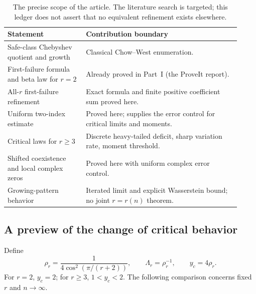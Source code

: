 \documentclass[11pt]{article}
\numberwithin{equation}{section}
\theoremstyle{definition}
\begin{document}
\begin{table}[ht]
\centering\small
\begin{tabular}{@{}p{0.31\linewidth}p{0.61\linewidth}@{}}
\toprule
Statement & Contribution boundary \\
\midrule
Safe-class Chebyshev quotient and growth & Classical Chow--West enumeration. \\
First-failure formula and beta law for \(r=2\) & Already proved in Part~I (the ProveIt report). \\
All-\(r\) first-failure refinement & Exact formula and finite positive coefficient sum proved here. \\
Uniform two-index estimate & Proved here; supplies the error control for critical limits and moments. \\
Critical laws for \(r\ge3\) & Discrete heavy-tailed deficit, sharp variation rate, moment threshold. \\
Shifted coexistence and local complex zeros & Proved here with uniform complex error control. \\
Growing-pattern behavior & Iterated limit and explicit Wasserstein bound; no joint \(r=r(n)\) theorem. \\
\bottomrule
\end{tabular}
\caption{The precise scope of the article. The literature search is targeted;
this ledger does not assert that no equivalent refinement exists elsewhere.}
\label{fpf:lp:tab:scope}
\end{table}

\subsection{A preview of the change of critical behavior}

Define
\begin{equation}\label{fpf:lp:eq:critical-location}
 \rho_r=\frac1{4\cos^2(\pi/(r+2))},\qquad
 \Lambda_r=\rho_r^{-1},\qquad y_c=4\rho_r.
\end{equation}
For \(r=2\), \(y_c=2\); for \(r\ge3\), \(1<y_c<2\).
The following comparison concerns fixed \(r\) and \(n\to\infty\).
\end{document}
